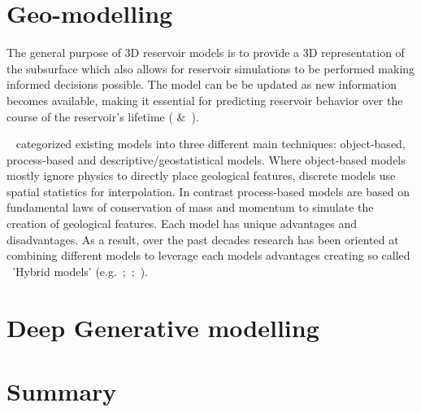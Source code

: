 \section{Geo-modelling}
The general purpose of 3D reservoir models is to provide a 3D representation of the subsurface which also allows for reservoir simulations to be performed making informed decisions possible. The model can be be updated as new information becomes available, making it essential for predicting reservoir behavior over the course of the reservoir's lifetime (\cite{emerick2025ensemble} \&~\cite{ringrose2016reservoir}). 

~\cite{koltermann1996heterogeneity} categorized existing models into three different main techniques: object-based, process-based and descriptive/geostatistical models. Where object-based models mostly ignore physics to directly place geological features, discrete models use spatial statistics for interpolation. In contrast process-based models are based on fundamental laws of conservation of mass and momentum to simulate the creation of geological features. Each model has unique advantages and disadvantages. As a result, over the past decades research has been oriented at combining different models to leverage each models advantages creating so called ~'Hybrid models' (e.g.~\cite{koltermann1996heterogeneity};~\cite{lopez2009process};~\cite{michael2010combining}). 
\section{Deep Generative modelling}


\section{Summary}
